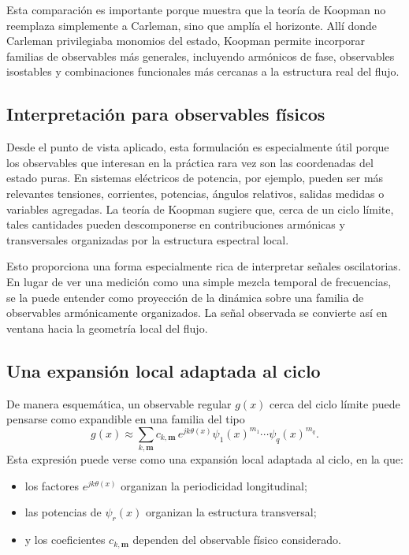 Esta comparación es importante porque muestra que la teoría de Koopman no reemplaza simplemente a Carleman, sino que amplía el horizonte. Allí donde Carleman privilegiaba monomios del estado, Koopman permite incorporar familias de observables más generales, incluyendo armónicos de fase, observables isostables y combinaciones funcionales más cercanas a la estructura real del flujo.

\subsection{Interpretación para observables físicos}

Desde el punto de vista aplicado, esta formulación es especialmente útil porque los observables que interesan en la práctica rara vez son las coordenadas del estado puras. En sistemas eléctricos de potencia, por ejemplo, pueden ser más relevantes tensiones, corrientes, potencias, ángulos relativos, salidas medidas o variables agregadas. La teoría de Koopman sugiere que, cerca de un ciclo límite, tales cantidades pueden descomponerse en contribuciones armónicas y transversales organizadas por la estructura espectral local.

Esto proporciona una forma especialmente rica de interpretar señales oscilatorias. En lugar de ver una medición como una simple mezcla temporal de frecuencias, se la puede entender como proyección de la dinámica sobre una familia de observables armónicamente organizados. La señal observada se convierte así en ventana hacia la geometría local del flujo.

\subsection{Una expansión local adaptada al ciclo}

De manera esquemática, un observable regular \(g(x)\) cerca del ciclo límite puede pensarse como expandible en una familia del tipo
\begin{equation}
g(x)\approx \sum_{k,\mathbf{m}} c_{k,\mathbf{m}}\,
e^{jk\theta(x)}
\psi_1(x)^{m_1}\cdots\psi_q(x)^{m_q}.
\label{eq:Koopman_harmonic_observables_local_expansion}
\end{equation}
Esta expresión puede verse como una expansión local adaptada al ciclo, en la que:
\begin{itemize}
\item los factores \(e^{jk\theta(x)}\) organizan la periodicidad longitudinal;
\item las potencias de \(\psi_r(x)\) organizan la estructura transversal;
\item y los coeficientes \(c_{k,\mathbf{m}}\) dependen del observable físico considerado.
\end{itemize}

